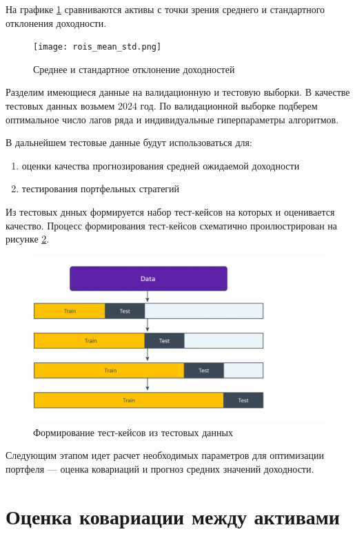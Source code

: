 На графике \ref{fig:rois_mean_std} сравниваются активы с точки зрения 
среднего и стандартного отклонения доходности.

\begin{figure}[H]
	\centering
	\texttt{[image: rois\_mean\_std.png]}
	\caption{Среднее и стандартное отклонение доходностей}
	\label{fig:rois_mean_std}
\end{figure}

Разделим имеющиеся данные на валидационную и тестовую выборки. В качестве тестовых данных возьмем 2024 год.
По валидационной выборке подберем оптимальное число лагов ряда и индивидуальные гиперпараметры алгоритмов.

В дальнейшем тестовые данные будут использоваться для:
\begin{enumerate}
	\item оценки качества прогнозирования средней ожидаемой доходности
	\item тестирования портфельных стратегий
\end{enumerate}

Из тестовых днных формируется набор тест-кейсов на которых и оценивается качество.
Процесс формирования тест-кейсов схематично проилюстрирован на рисунке \ref{fig:ts_csv}.
\begin{figure}[H]
	\centering
	\includegraphics[width=\textwidth]{images/ts_cv}
	\caption{Формирование тест-кейсов из тестовых данных}
	\label{fig:ts_csv}
\end{figure}

Следующим этапом идет расчет необходимых параметров для оптимизации портфеля --- 
оценка ковариаций и прогноз средних значений доходности.

\section{Оценка ковариации между активами}


